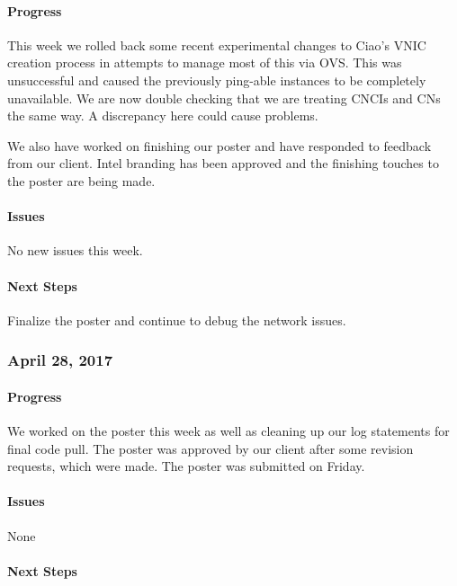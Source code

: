 \documentclass[10pt,onecolumn,journal,draftclsnofoot]{IEEEtran}
\begin{document}
\paragraph{Progress} 

This week we rolled back some recent experimental changes to Ciao's VNIC
creation process in attempts to manage most of this via OVS. This was
unsuccessful and caused the previously ping-able instances to be
completely unavailable. We are now double checking that we are treating
CNCIs and CNs the same way. A discrepancy here could cause problems.

We also have worked on finishing our poster and have responded to
feedback from our client. Intel branding has been approved and the
finishing touches to the poster are being made.

\paragraph{Issues} 

No new issues this week.

\paragraph{Next Steps} 

Finalize the poster and continue to debug the network issues.

\subsubsection{April 28, 2017} 

\paragraph{Progress} 

We worked on the poster this week as well as cleaning up our log
statements for final code pull. The poster was approved by our client
after some revision requests, which were made. The poster was submitted
on Friday.

\paragraph{Issues} 

None

\paragraph{Next Steps} 
\end{document}
